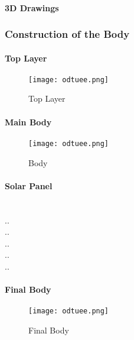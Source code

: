 \paragraph{3D Drawings}



\subsubsection{Construction of the Body}

\paragraph{Top Layer}



\begin{figure}[H]
\texttt{[image: odtuee.png]}\\[1cm]
\caption{\label{fig:cooling}Top Layer }
\end{figure}



\paragraph{Main Body}

\begin{figure}[H]
\texttt{[image: odtuee.png]}\\[1cm]
\caption{\label{fig:cooling}Body }
\end{figure}


\paragraph{Solar Panel}
\-
\\
..  \\
..  \\
..  \\
..  \\
..  \\



\paragraph{Final Body}




\begin{figure}[H]
\texttt{[image: odtuee.png]}\\[1cm]
\caption{\label{fig:cooling}Final Body }
\end{figure}


